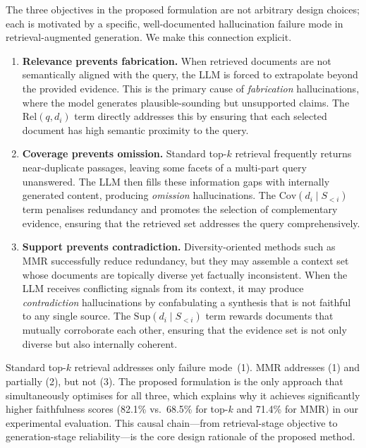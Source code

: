 \documentclass[conference]{IEEEtran}
\begin{document}
The three objectives in the proposed formulation are not arbitrary design choices; each is motivated by a specific, well-documented hallucination failure mode in retrieval-augmented generation. We make this connection explicit.

\begin{enumerate}
\item \textbf{Relevance prevents fabrication.} When retrieved documents are not semantically aligned with the query, the LLM is forced to extrapolate beyond the provided evidence. This is the primary cause of \emph{fabrication} hallucinations, where the model generates plausible-sounding but unsupported claims. The $\mathrm{Rel}(q, d_i)$ term directly addresses this by ensuring that each selected document has high semantic proximity to the query.

\item \textbf{Coverage prevents omission.} Standard top-$k$ retrieval frequently returns near-duplicate passages, leaving some facets of a multi-part query unanswered. The LLM then fills these information gaps with internally generated content, producing \emph{omission} hallucinations. The $\mathrm{Cov}(d_i \mid S_{<i})$ term penalises redundancy and promotes the selection of complementary evidence, ensuring that the retrieved set addresses the query comprehensively.

\item \textbf{Support prevents contradiction.} Diversity-oriented methods such as MMR successfully reduce redundancy, but they may assemble a context set whose documents are topically diverse yet factually inconsistent. When the LLM receives conflicting signals from its context, it may produce \emph{contradiction} hallucinations by confabulating a synthesis that is not faithful to any single source. The $\mathrm{Sup}(d_i \mid S_{<i})$ term rewards documents that mutually corroborate each other, ensuring that the evidence set is not only diverse but also internally coherent.
\end{enumerate}

Standard top-$k$ retrieval addresses only failure mode~(1). MMR addresses (1) and partially (2), but not (3). The proposed formulation is the only approach that simultaneously optimises for all three, which explains why it achieves significantly higher faithfulness scores (82.1\% vs.\ 68.5\% for top-$k$ and 71.4\% for MMR) in our experimental evaluation. This causal chain---from retrieval-stage objective to generation-stage reliability---is the core design rationale of the proposed method.
\end{document}
